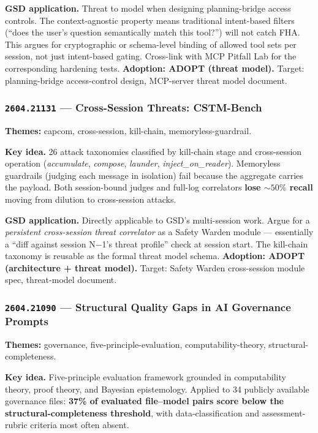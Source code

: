 \documentclass[11pt,letterpaper]{article}
\newcommand{\arxivid}[1]{\texttt{\textcolor{accent}{#1}}}
\newcommand{\paperhead}[2]{\noindent\textbf{\sffamily\textcolor{secondary}{#1}} \textemdash{} #2}
\begin{document}
\textbf{GSD application.} Threat to model when designing planning-bridge access controls. The context-agnostic property means traditional intent-based filters (``does the user's question semantically match this tool?'') will not catch FHA. This argues for cryptographic or schema-level binding of allowed tool sets per session, not just intent-based gating. Cross-link with MCP Pitfall Lab for the corresponding hardening tests. \textbf{Adoption: ADOPT (threat model).} Target: planning-bridge access-control design, MCP-server threat model document.

\subsubsection{\arxivid{2604.21131} --- Cross-Session Threats: CSTM-Bench}

\paperhead{Themes:}{capcom, cross-session, kill-chain, memoryless-guardrail.}

\textbf{Key idea.} 26 attack taxonomies classified by kill-chain stage and cross-session operation (\textit{accumulate}, \textit{compose}, \textit{launder}, \textit{inject\_on\_reader}). Memoryless guardrails (judging each message in isolation) fail because the aggregate carries the payload. Both session-bound judges and full-log correlators \textbf{lose ${\sim}50\%$ recall} moving from dilution to cross-session attacks.

\textbf{GSD application.} Directly applicable to GSD's multi-session work. Argue for a \textit{persistent cross-session threat correlator} as a Safety Warden module --- essentially a ``diff against session N$-$1's threat profile'' check at session start. The kill-chain taxonomy is reusable as the formal threat model schema. \textbf{Adoption: ADOPT (architecture + threat model).} Target: Safety Warden cross-session module spec, threat-model document.

\subsubsection{\arxivid{2604.21090} --- Structural Quality Gaps in AI Governance Prompts}

\paperhead{Themes:}{governance, five-principle-evaluation, computability-theory, structural-completeness.}

\textbf{Key idea.} Five-principle evaluation framework grounded in computability theory, proof theory, and Bayesian epistemology. Applied to 34 publicly available governance files: \textbf{37\% of evaluated file--model pairs score below the structural-completeness threshold}, with data-classification and assessment-rubric criteria most often absent.
\end{document}
